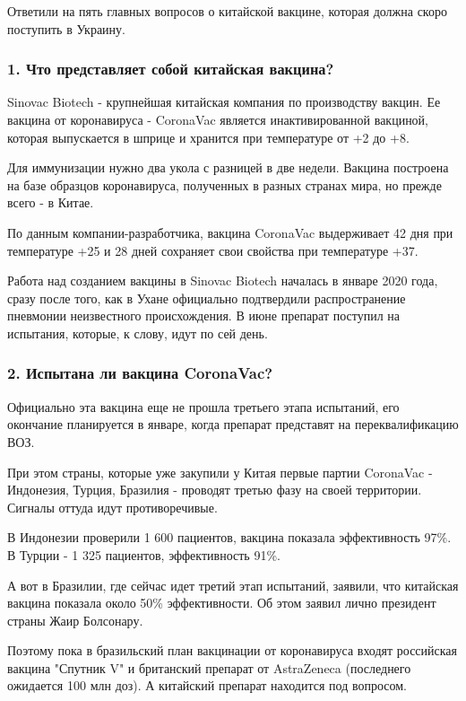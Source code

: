 Ответили на пять главных вопросов о китайской вакцине, которая должна скоро
поступить в Украину.

\subsubsection{1. Что представляет собой китайская вакцина?}

Sinovac Biotech - крупнейшая китайская компания по производству вакцин. Ее
вакцина от коронавируса - CoronaVac является инактивированной вакциной, которая
выпускается в шприце и хранится при температуре от +2 до +8.

Для иммунизации нужно два укола с разницей в две недели. Вакцина построена на
базе образцов коронавируса, полученных в разных странах мира, но прежде всего -
в Китае. 

По данным компании-разработчика, вакцина CoronaVac выдерживает 42 дня при
температуре +25 и 28 дней сохраняет свои свойства при температуре +37.

Работа над созданием вакцины в Sinovac Biotech началась в январе 2020 года,
сразу после того, как в Ухане официально подтвердили распространение пневмонии
неизвестного происхождения. В июне препарат поступил на испытания, которые, к
слову, идут по сей день. 

\subsubsection{2. Испытана ли вакцина CoronaVac?}

Официально эта вакцина еще не прошла третьего этапа испытаний, его окончание
планируется в январе, когда препарат представят на переквалификацию ВОЗ. 

При этом страны, которые уже закупили у Китая первые партии CoronaVac -
Индонезия, Турция, Бразилия - проводят третью фазу на своей территории. Сигналы
оттуда идут противоречивые. 

В Индонезии проверили 1 600 пациентов, вакцина показала эффективность 97\%. В
Турции - 1 325 пациентов, эффективность 91\%. 

А вот в Бразилии, где сейчас идет третий этап испытаний, заявили, что китайская
вакцина показала около 50\% эффективности. Об этом заявил лично президент
страны Жаир Болсонару.

Поэтому пока в бразильский план вакцинации от коронавируса входят российская
вакцина "Спутник V" и британский препарат от AstraZeneca (последнего ожидается
100 млн доз). А китайский препарат находится под вопросом. 

